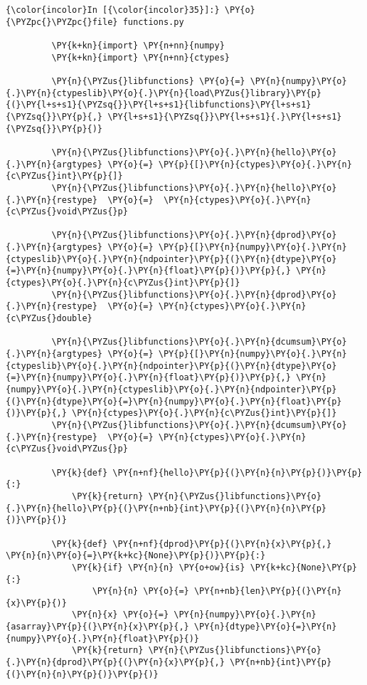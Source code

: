     \begin{Verbatim}[commandchars=\\\{\}]
{\color{incolor}In [{\color{incolor}35}]:} \PY{o}{\PYZpc{}\PYZpc{}file} functions.py
         
         \PY{k+kn}{import} \PY{n+nn}{numpy}
         \PY{k+kn}{import} \PY{n+nn}{ctypes}
         
         \PY{n}{\PYZus{}libfunctions} \PY{o}{=} \PY{n}{numpy}\PY{o}{.}\PY{n}{ctypeslib}\PY{o}{.}\PY{n}{load\PYZus{}library}\PY{p}{(}\PY{l+s+s1}{\PYZsq{}}\PY{l+s+s1}{libfunctions}\PY{l+s+s1}{\PYZsq{}}\PY{p}{,} \PY{l+s+s1}{\PYZsq{}}\PY{l+s+s1}{.}\PY{l+s+s1}{\PYZsq{}}\PY{p}{)}
         
         \PY{n}{\PYZus{}libfunctions}\PY{o}{.}\PY{n}{hello}\PY{o}{.}\PY{n}{argtypes} \PY{o}{=} \PY{p}{[}\PY{n}{ctypes}\PY{o}{.}\PY{n}{c\PYZus{}int}\PY{p}{]}
         \PY{n}{\PYZus{}libfunctions}\PY{o}{.}\PY{n}{hello}\PY{o}{.}\PY{n}{restype}  \PY{o}{=}  \PY{n}{ctypes}\PY{o}{.}\PY{n}{c\PYZus{}void\PYZus{}p}
         
         \PY{n}{\PYZus{}libfunctions}\PY{o}{.}\PY{n}{dprod}\PY{o}{.}\PY{n}{argtypes} \PY{o}{=} \PY{p}{[}\PY{n}{numpy}\PY{o}{.}\PY{n}{ctypeslib}\PY{o}{.}\PY{n}{ndpointer}\PY{p}{(}\PY{n}{dtype}\PY{o}{=}\PY{n}{numpy}\PY{o}{.}\PY{n}{float}\PY{p}{)}\PY{p}{,} \PY{n}{ctypes}\PY{o}{.}\PY{n}{c\PYZus{}int}\PY{p}{]}
         \PY{n}{\PYZus{}libfunctions}\PY{o}{.}\PY{n}{dprod}\PY{o}{.}\PY{n}{restype}  \PY{o}{=} \PY{n}{ctypes}\PY{o}{.}\PY{n}{c\PYZus{}double}
         
         \PY{n}{\PYZus{}libfunctions}\PY{o}{.}\PY{n}{dcumsum}\PY{o}{.}\PY{n}{argtypes} \PY{o}{=} \PY{p}{[}\PY{n}{numpy}\PY{o}{.}\PY{n}{ctypeslib}\PY{o}{.}\PY{n}{ndpointer}\PY{p}{(}\PY{n}{dtype}\PY{o}{=}\PY{n}{numpy}\PY{o}{.}\PY{n}{float}\PY{p}{)}\PY{p}{,} \PY{n}{numpy}\PY{o}{.}\PY{n}{ctypeslib}\PY{o}{.}\PY{n}{ndpointer}\PY{p}{(}\PY{n}{dtype}\PY{o}{=}\PY{n}{numpy}\PY{o}{.}\PY{n}{float}\PY{p}{)}\PY{p}{,} \PY{n}{ctypes}\PY{o}{.}\PY{n}{c\PYZus{}int}\PY{p}{]}
         \PY{n}{\PYZus{}libfunctions}\PY{o}{.}\PY{n}{dcumsum}\PY{o}{.}\PY{n}{restype}  \PY{o}{=} \PY{n}{ctypes}\PY{o}{.}\PY{n}{c\PYZus{}void\PYZus{}p}
         
         \PY{k}{def} \PY{n+nf}{hello}\PY{p}{(}\PY{n}{n}\PY{p}{)}\PY{p}{:}
             \PY{k}{return} \PY{n}{\PYZus{}libfunctions}\PY{o}{.}\PY{n}{hello}\PY{p}{(}\PY{n+nb}{int}\PY{p}{(}\PY{n}{n}\PY{p}{)}\PY{p}{)}
         
         \PY{k}{def} \PY{n+nf}{dprod}\PY{p}{(}\PY{n}{x}\PY{p}{,} \PY{n}{n}\PY{o}{=}\PY{k+kc}{None}\PY{p}{)}\PY{p}{:}
             \PY{k}{if} \PY{n}{n} \PY{o+ow}{is} \PY{k+kc}{None}\PY{p}{:}
                 \PY{n}{n} \PY{o}{=} \PY{n+nb}{len}\PY{p}{(}\PY{n}{x}\PY{p}{)}
             \PY{n}{x} \PY{o}{=} \PY{n}{numpy}\PY{o}{.}\PY{n}{asarray}\PY{p}{(}\PY{n}{x}\PY{p}{,} \PY{n}{dtype}\PY{o}{=}\PY{n}{numpy}\PY{o}{.}\PY{n}{float}\PY{p}{)}
             \PY{k}{return} \PY{n}{\PYZus{}libfunctions}\PY{o}{.}\PY{n}{dprod}\PY{p}{(}\PY{n}{x}\PY{p}{,} \PY{n+nb}{int}\PY{p}{(}\PY{n}{n}\PY{p}{)}\PY{p}{)}
         

\end{Verbatim}
